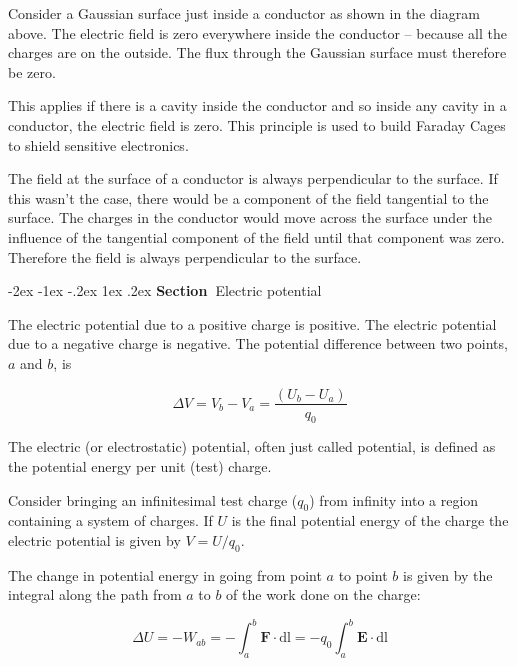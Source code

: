 \documentclass[
]{book}
\makeatletter
\renewcommand\section{%
\@startsection{section}{1}{\z@}%
              {-2ex \@plus -1ex \@minus -.2ex}%
              {1ex \@plus .2ex}%
              {\sffamily\bfseries\large\noindent Section~}}
\makeatother
\begin{document}
Consider a Gaussian surface just inside a conductor as shown in the diagram above. The
electric field is zero everywhere inside the conductor -- because all
the charges are on the outside. The flux through the Gaussian surface
must therefore be zero.

This applies if there is a cavity inside the conductor and so inside any
cavity in a conductor, the electric field is zero. This principle is
used to build Faraday Cages to shield sensitive electronics.

The field at the surface of a conductor is always perpendicular to the
surface. If this wasn't the case, there would be a component of the
field tangential to the surface. The charges in the conductor would move
across the surface under the influence of the tangential component of
the field until that component was zero. Therefore the field is always
perpendicular to the surface.

\hypertarget{electric-potential-1}{%
\section{Electric potential}\label{electric-potential-1}}

The electric potential due to a positive charge is positive. The
electric potential due to a negative charge is negative. The potential
difference between two points, \(a\) and \(b\), is

\begin{equation}
\label{eq:DeltaV}
\Delta V = V_b - V_a =\frac{(U_b - U_a)}{q_0}   
\end{equation}

The electric (or electrostatic) potential, often just called potential,
is defined as the potential energy per unit (test) charge.

Consider bringing an infinitesimal test charge (\(q_0\)) from infinity
into a region containing a system of charges. If \(U\) is the final
potential energy of the charge the electric potential is given by
\(V = U/q_0\).

The change in potential energy in going from point \(a\) to point \(b\) is
given by the integral along the path from \(a\) to \(b\) of the work done on
the charge:

\begin{equation}
\label{eq:DeltaU}
\Delta U = - W_{ab} = -\int_a^b \mathbf{F} \cdot \mathrm{d}\mathrm{l} = -q_0 \int_a^b \mathbf{E} \cdot \mathrm{d}\mathrm{l}
\end{equation}
\end{document}

